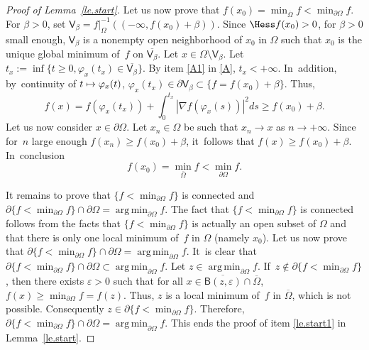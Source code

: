 \documentclass[10pt]{amsart}
\newcommand\mto{\mathchoice{\longmapsto}{\mapsto}{\mapsto}{\mapsto}}
\let\pa\partial
\let\ve\varepsilon
\DeclareMathOperator*{\argmin}{arg\,min}
\theoremstyle{plain}
\theoremstyle{definition}
\begin{document}
\begin{proof}[Proof of Lemma~\ref{le.start}]
Let us now prove that $f(x_0)=\min_{\overline \Omega}f<\min_{\partial \Omega}f$. For $\beta >0$, set $\mathsf V_\beta=f|_{\Omega}^{-1}((-\infty,f(x_0)+ \beta))$. Since $\Hess f(x_0)>0$, for $\beta>0$ small enough,
$\mathsf V_\beta$ is a nonempty open neighborhood of $x_0$ in $\Omega$ such that
$x_0$ is the unique global minimum of~$f$ on $ \overline{\mathsf V_\beta}$.
Let $x\in \Omega\setminus {\mathsf V_\beta}$. Let $t_x:=\inf\{t\ge 0, \varphi_x(t_x)\in \overline{\mathsf V_\beta}\}$.
By item \eqref{A1} in \ref{A}, $t_x<+\infty$. In~addition, by~continuity of $t\mto \varphi_x(t)$, $\varphi_x(t_x)\in \pa \mathsf V_\beta\subset \{f=f(x_0)+\beta\}$. Thus,
\[
f(x) =f(\varphi_x({t_x})) + \int_0^{t_x} |\nabla f(\varphi_x(s))|^2ds \ge f(x_0)+\beta.
\]
Let us now consider $x\in \partial \Omega$. Let $x_n\in \Omega$ be such that $x_n\to x$ as $n\to +\infty$. Since for~$n$ large enough $f(x_n)\ge f(x_0)+\beta$, it~follows that $f(x)\ge f(x_0)+\beta$. In~conclusion
\[
f(x_0)=\min_{\overline \Omega}f<\min_{\partial \Omega}f.
\]

It remains to prove that
$\{f< \min_{\partial \Omega}f\}$ is connected and $\pa \{f< \min_{\partial \Omega}f\}\cap \partial \Omega =\argmin_{\partial \Omega}f$. The fact that $\{f< \min_{\partial \Omega}f\}$ is connected follows from the facts that $\{f< \min_{\partial \Omega}f\}$ is actually an open subset of $\Omega$ and that there is only one local minimum of~$f$ in $\Omega$ (namely $x_0$). Let us now prove that $\pa \{f< \min_{\partial \Omega}f\}\cap \partial \Omega =\argmin_{\partial \Omega}f$. It~is clear that $\pa \{f< \min_{\partial \Omega}f\}\cap \partial \Omega \subset \argmin_{\partial \Omega}f$. Let $z\in \argmin_{\partial \Omega}f$. If~$z\notin \pa \{f< \min_{\partial \Omega}f\}$, then there exists $\ve >0$ such that for all $x\in \overline{\mathsf B(z,\ve)}\cap \overline{\Omega}$, $f(x)\ge \min_{\partial \Omega}f=f(z)$. Thus, $z$ is a local minimum of~$f$ in $\overline \Omega$, which is not possible. Consequently $z\in \pa \{f< \min_{\partial \Omega}f\}$. Therefore, $\pa \{f< \min_{\partial \Omega}f\}\cap \partial \Omega =\argmin_{\partial \Omega}f$. This ends the proof of item \eqref{le.start1} in Lemma~\ref{le.start}.


\end{proof}
\end{document}
